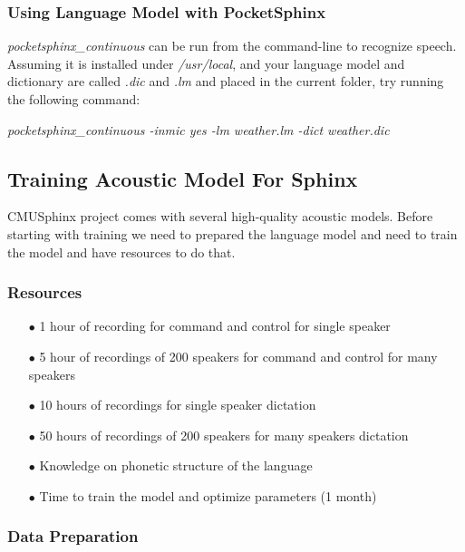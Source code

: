 \documentclass[12pt,a4paper,oldfontcommands]{memoir}
\begin{document}
\subsubsection{Using Language Model with PocketSphinx}

\textit{pocketsphinx\_continuous} can be run from the command-line to recognize speech. Assuming it is installed under \textit{/usr/local}, and your language model and dictionary are called \textit{.dic} and \textit{.lm} and placed in the current folder, try running the following command: 

\textit{pocketsphinx\_continuous -inmic yes -lm weather.lm -dict weather.dic}


\subsection{Training Acoustic Model For Sphinx}
CMUSphinx project comes with several high-quality acoustic models. Before starting with training we need to prepared the language model and  need to train the model and have resources to do that.

\subsubsection{Resources}
\begin{itemize}
 \item[$\bullet$] 1 hour of recording for command and control for single speaker
 \item[$\bullet$] 5 hour of recordings of 200 speakers for command and control for many speakers
 \item[$\bullet$] 10 hours of recordings for single speaker dictation
 \item[$\bullet$] 50 hours of recordings of 200 speakers for many speakers dictation
 \item[$\bullet$] Knowledge on phonetic structure of the language
 \item[$\bullet$] Time to train the model and optimize parameters (1 month)
\end{itemize}

\subsubsection{Data Preparation}
\end{document}
